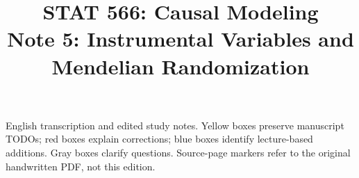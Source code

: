
\title{STAT 566: Causal Modeling\\[.4em]\large Note 5: Instrumental Variables and Mendelian Randomization}

\maketitle
\begin{remarkbox}
English transcription and edited study notes. Yellow boxes preserve manuscript TODOs; red boxes explain corrections; blue boxes identify lecture-based additions. Gray boxes clarify questions. Source-page markers refer to the original handwritten PDF, not this edition.
\end{remarkbox}
\tableofcontents
\clearpage


